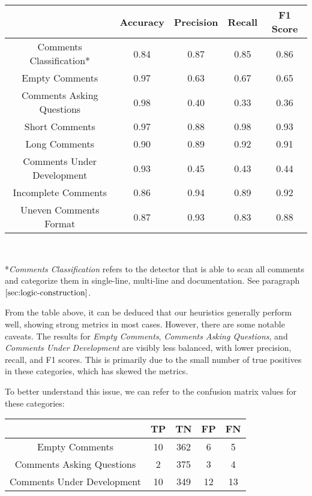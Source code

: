 \begin{center}
	\begin{tabular}{|c|c|c|c|c|}
		\hline
		& \textbf{Accuracy} & \textbf{Precision} & \textbf{Recall} & \textbf{F1 Score} \\
		\hline Comments Classification*    & 0.84     & 0.87      & 0.85   & 0.86    \\
		\hline Empty Comments             & 0.97     & 0.63      & 0.67   & 0.65    \\
		\hline Comments Asking Questions  & 0.98     & 0.40      & 0.33   & 0.36    \\
		\hline Short Comments             & 0.97     & 0.88      & 0.98   & 0.93    \\
		\hline Long Comments              & 0.90     & 0.89      & 0.92   & 0.91    \\
		\hline Comments Under Development & 0.93     & 0.45      & 0.43   & 0.44    \\
		\hline Incomplete Comments        & 0.86     & 0.94      & 0.89   & 0.92    \\
		\hline Uneven Comments Format     & 0.87     & 0.93      & 0.83   & 0.88   \\
		\hline
	\end{tabular}
	
	\textit{\\}
	
	*\textit{Comments Classification} refers to the detector that is able to scan all comments and categorize them in single-line, multi-line and documentation. See paragraph $\ref{sec:logic-construction}$.
\end{center}

\noindent From the table above, it can be deduced that our heuristics generally perform well, showing strong metrics in most cases. However, there are some notable caveats. The results for \textit{Empty Comments}, \textit{Comments Asking Questions}, and \textit{Comments Under Development} are visibly less balanced, with lower precision, recall, and F1 scores. This is primarily due to the small number of true positives in these categories, which has skewed the metrics.

\noindent To better understand this issue, we can refer to the confusion matrix values for these categories:
\begin{center}
	\begin{tabular}{|c|c|c|c|c|}
		\hline
		& \textbf{TP} & \textbf{TN} & \textbf{FP} & \textbf{FN} \\
		\hline Empty Comments             & 10     & 362      & 6   & 5    \\
		\hline Comments Asking Questions  & 2     & 375      & 3   & 4    \\
		\hline Comments Under Development & 10     & 349      & 12   & 13    \\
		\hline
	\end{tabular}
\end{center}

